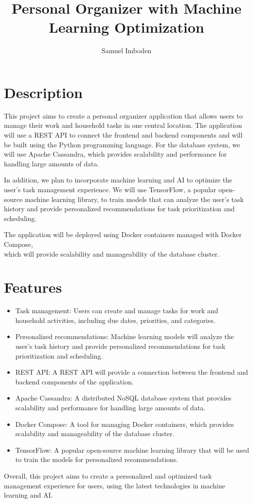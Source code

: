 \documentclass{article}
\begin{document}
\title{Personal Organizer with Machine Learning Optimization}
\author{Samuel Imboden}

\maketitle

\section{Description}

This project aims to create a personal organizer application that allows users to manage their work and household tasks in one central location. The application will use a REST API to connect the frontend and backend components and will be built using the Python programming language. For the database system, we will use Apache Cassandra, which provides scalability and performance for handling large amounts of data.

In addition, we plan to incorporate machine learning and AI to optimize the user's task management experience. We will use TensorFlow, a popular open-source machine learning library, to train models that can analyze the user's task history and provide personalized recommendations for task prioritization and scheduling.

The application will be deployed using Docker containers managed with Docker Compose,\\ which will provide scalability and manageability of the database cluster.

\section{Features}

\begin{itemize}
  \item Task management: Users can create and manage tasks for work and household activities, including due dates, priorities, and categories.
  
  \item Personalized recommendations: Machine learning models will analyze the user's task history and provide personalized recommendations for task prioritization and scheduling.
  
  \item REST API: A REST API will provide a connection between the frontend and backend components of the application.
  
  \item Apache Cassandra: A distributed NoSQL database system that provides scalability and performance for handling large amounts of data.
  
  \item Docker Compose: A tool for managing Docker containers, which provides scalability and manageability of the database cluster.
  
  \item TensorFlow: A popular open-source machine learning library that will be used to train the models for personalized recommendations.
\end{itemize}

Overall, this project aims to create a personalized and optimized task management experience for users, using the latest technologies in machine learning and AI.
\end{document}
